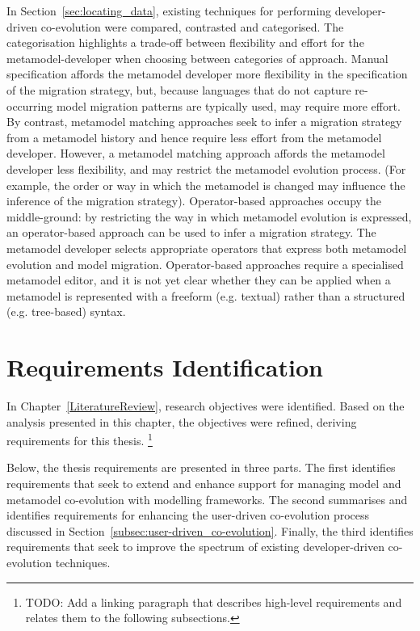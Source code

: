 In Section~\ref{sec:locating_data}, existing techniques for performing developer-driven co-evolution were compared, contrasted and categorised. The categorisation highlights a trade-off between flexibility and effort for the metamodel-developer when choosing between categories of approach. Manual specification affords the metamodel developer more flexibility in the specification of the migration strategy, but, because languages that do not capture re-occurring model migration patterns are typically used, may require more effort. By contrast, metamodel matching approaches seek to infer a migration strategy from a metamodel history and hence require less effort from the metamodel developer. However, a metamodel matching approach affords the metamodel developer less flexibility, and may restrict the metamodel evolution process. (For example, the order or way in which the metamodel is changed may influence the inference of the migration strategy). Operator-based approaches occupy the middle-ground: by restricting the way in which metamodel evolution is expressed, an operator-based approach can be used to infer a migration strategy. The metamodel developer selects appropriate operators that express both metamodel evolution and model migration. Operator-based approaches require a specialised metamodel editor, and it is not yet clear whether they can be applied when a metamodel is represented with a freeform (e.g. textual) rather than a structured (e.g. tree-based) syntax.


\section{Requirements Identification}
\label{sec:requirements_identification}

In Chapter~\ref{LiteratureReview}, research objectives were identified. Based on the analysis presented in this chapter, the objectives were refined, deriving requirements for this thesis. \footnote{TODO: Add a linking paragraph that describes high-level requirements and relates them to the following subsections.}

Below, the thesis requirements are presented in three parts. The first identifies requirements that seek to extend and enhance support for managing model and metamodel co-evolution with modelling frameworks. The second summarises and identifies requirements for enhancing the user-driven co-evolution process discussed in Section~\ref{subsec:user-driven_co-evolution}. Finally, the third identifies requirements that seek to improve the spectrum of existing developer-driven co-evolution techniques.


